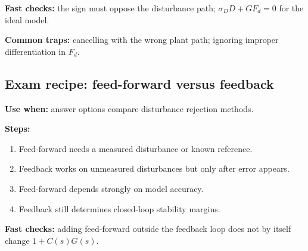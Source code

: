 \textbf{Fast checks:} the sign must oppose the disturbance path; \(\sigma_DD+GF_d=0\) for the ideal model.

\textbf{Common traps:} cancelling with the wrong plant path; ignoring improper differentiation in \(F_d\).

\subsection{Exam recipe: feed-forward versus feedback}

\textbf{Use when:} answer options compare disturbance rejection methods.

\textbf{Steps:}
\begin{enumerate}
\item Feed-forward needs a measured disturbance or known reference.
\item Feedback works on unmeasured disturbances but only after error appears.
\item Feed-forward depends strongly on model accuracy.
\item Feedback still determines closed-loop stability margins.
\end{enumerate}

\textbf{Fast checks:} adding feed-forward outside the feedback loop does not by itself change \(1+C(s)G(s)\).
